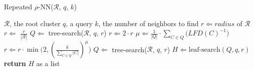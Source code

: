 \documentclass{article}
\begin{document}
\begin{algorithm} %
    \caption{Repeated $\rho$-NN($\mathcal{R}$, $q$, $k$)} %
    \label{alg:methods:repeated-rnn} %
    \begin{algorithmic} %
        \Require $\mathcal{R}$, the root cluster
        \Require $q$, a query
        \Require $k$, the number of neighbors to find
        \State $r \Leftarrow radius$ of $\mathcal{R}$
        \State $r \Leftarrow$ $\frac{r}{|\mathcal{R}|}$
        \State $Q \Leftarrow$ tree-search($\mathcal{R}$, $q$, $r$)
                \State $r \Leftarrow 2 \cdot r$
                \State $\mu \Leftarrow \frac{1}{|Q|} \cdot \sum_{C \in Q} \big( LFD(C)^{-1} \big)$
                \State $r \Leftarrow r \cdot \min \bigg( 2, \left( {\frac{k}{\sum_{C \in Q} |C|}} \right)^{\mu} \bigg)$
            \EndIf
            \State $Q \Leftarrow$ tree-search($\mathcal{R}$, $q$, $r$)
        \EndWhile
        \State $H \Leftarrow \text{leaf-search}(Q, q, r)$
        \State \textbf{return} $H$ as a list
    \end{algorithmic}
\end{algorithm}
\end{document}
